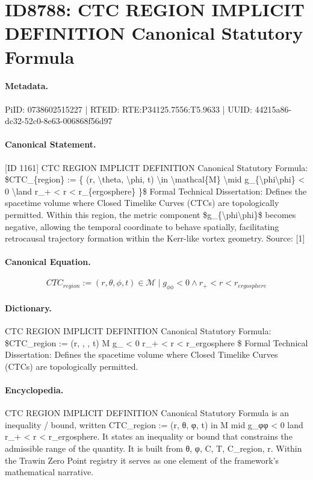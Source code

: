 \section*{ID8788: CTC REGION IMPLICIT DEFINITION Canonical Statutory Formula}
\paragraph{Metadata.}
PiID: 0738602515227 | RTEID: RTE:P34125.7556:T5.9633 | UUID: 44215a86-dc32-52c0-8e63-006868f56d97

\paragraph{Canonical Statement.}
[ID 1161] CTC REGION IMPLICIT DEFINITION Canonical Statutory Formula: \$CTC\_\{region\} := \{ (r, \textbackslash{}theta, \textbackslash{}phi, t) \textbackslash{}in \textbackslash{}mathcal\{M\} \textbackslash{}mid g\_\{\textbackslash{}phi\textbackslash{}phi\} < 0 \textbackslash{}land r\_+ < r < r\_\{ergosphere\} \}\$ Formal Technical Dissertation: Defines the spacetime volume where Closed Timelike Curves (CTCs) are topologically permitted. Within this region, the metric component \$g\_\{\textbackslash{}phi\textbackslash{}phi\}\$ becomes negative, allowing the temporal coordinate to behave spatially, facilitating retrocausal trajectory formation within the Kerr-like vortex geometry. Source: [1]

\paragraph{Canonical Equation.}
\[
CTC_{region} := { (r, \theta, \phi, t) \in \mathcal{M} \mid g_{\phi\phi} < 0 \land r_+ < r < r_{ergosphere} }
\]

\paragraph{Dictionary.}
CTC REGION IMPLICIT DEFINITION Canonical Statutory Formula: \$CTC\_region := (r, , , t) M g\_ < 0 r\_+ < r < r\_ergosphere \$ Formal Technical Dissertation: Defines the spacetime volume where Closed Timelike Curves (CTCs) are topologically permitted.

\paragraph{Encyclopedia.}
CTC REGION IMPLICIT DEFINITION Canonical Statutory Formula is an inequality / bound, written CTC\_region := (r, θ, φ, t) in M mid g\_φφ < 0 land r\_+ < r < r\_ergosphere. It states an inequality or bound that constrains the admissible range of the quantity. It is built from θ, φ, C, T, C\_region, r. Within the Trawin Zero Point registry it serves as one element of the framework's mathematical narrative.
